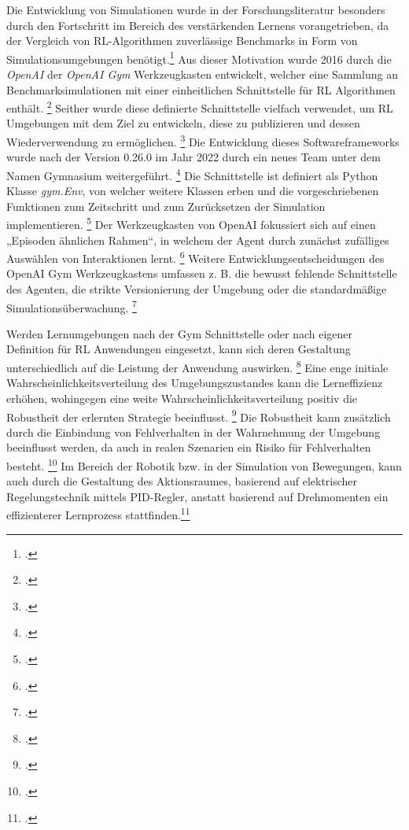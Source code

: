 Die Entwicklung von Simulationen wurde in der Forschungsliteratur besonders durch den Fortschritt im Bereich des verstärkenden Lernens vorangetrieben, da der Vergleich von RL-Algorithmen zuverlässige Benchmarks in Form von Simulationsumgebungen benötigt.\footcite[Vgl.][S. 1]{Brockman.2016}
Aus dieser Motivation wurde 2016 durch die \textit{OpenAI} der \textit{OpenAI Gym} Werkzeugkasten entwickelt, welcher eine Sammlung an Benchmarksimulationen mit einer einheitlichen Schnittstelle für RL Algorithmen enthält. \footcite[Vgl.][S. 1]{Brockman.2016}
Seither wurde diese definierte Schnittstelle vielfach verwendet, um RL Umgebungen mit dem Ziel zu entwickeln, diese zu publizieren und dessen Wiederverwendung zu ermöglichen. \footcite[Vgl.][S. 4]{Schuderer.2021}
Die Entwicklung dieses Softwareframeworks wurde nach der Version 0.26.0 im Jahr 2022 durch ein neues Team unter dem Namen Gymnasium weitergeführt. \footcite[Vgl.][]{GitHub.442023}
Die Schnittstelle ist definiert als Python Klasse \textit{gym.Env}, von welcher weitere Klassen erben und die vorgeschriebenen Funktionen zum Zeitschritt und zum Zurücksetzen der Simulation implementieren. \footcite[Vgl.][S. 4]{Schuderer.2021}
Der Werkzeugkasten von OpenAI fokussiert sich auf einen „Episoden ähnlichen Rahmen“, in welchem der Agent durch zunächst zufälliges Auswählen von Interaktionen lernt. \footcite[Vgl.][S. 1]{Brockman.2016}
Weitere Entwicklungsentscheidungen des OpenAI Gym Werkzeugkastens umfassen z. B. die bewusst fehlende Schnittstelle des Agenten, die strikte Versionierung der Umgebung oder die standardmäßige Simulationsüberwachung. \footcite[Vgl.][S. 2f.]{Brockman.2016} %

Werden Lernumgebungen nach der Gym Schnittstelle oder nach eigener Definition für RL Anwendungen eingesetzt, kann sich deren Gestaltung unterschiedlich auf die Leistung der Anwendung auswirken. \footcite[Vgl.][S. 1]{Reda.2020}
Eine enge initiale Wahrscheinlichkeitsverteilung des Umgebungszustandes kann die Lerneffizienz erhöhen, wohingegen eine weite Wahrscheinlichkeitsverteilung positiv die Robustheit der erlernten Strategie beeinflusst. \footcite[Vgl.][S. 3]{Reda.2020}
Die Robustheit kann zusätzlich durch die Einbindung von Fehlverhalten in der Wahrnehmung der Umgebung beeinflusst werden, da auch in realen Szenarien ein Risiko für Fehlverhalten besteht. \footcite[Vgl.][S. 2]{YanDuan.2016} 
Im Bereich der Robotik bzw. in der Simulation von Bewegungen, kann auch durch die Gestaltung des Aktionsraumes, basierend auf elektrischer Regelungstechnik mittels PID-Regler, anstatt basierend auf Drehmomenten ein effizienterer Lernprozess stattfinden.\footcite[Vgl.][S. 7]{Reda.2020}

